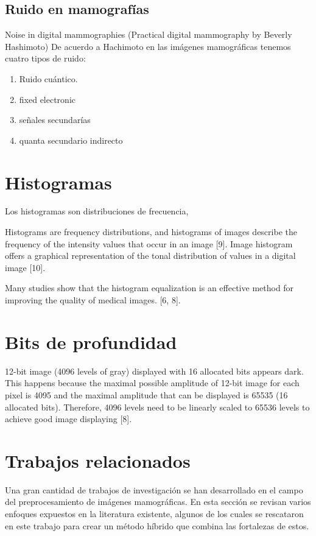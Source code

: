 \subsection{Ruido en mamografías}

Noise in digital mammographies (Practical digital mammography by Beverly
Hashimoto) De acuerdo a Hachimoto en las imágenes mamográficas tenemos cuatro
tipos de ruido:

\begin{enumerate}
    \item Ruido cuántico.
    \item fixed electronic
    \item señales secundarías
    \item quanta secundario indirecto
\end{enumerate}

\section{Histogramas}
Los histogramas son distribuciones de frecuencia, 

Histograms are frequency distributions, and histograms of images describe the
frequency of the intensity values that occur in an image [9]. Image histogram
offers a graphical representation of the tonal distribution of values in a
digital image [10].


Many studies show that the histogram equalization is an effective method for
improving the quality of medical images. [6, 8]. 

\section{Bits de profundidad}

12-bit image (4096 levels of gray) displayed with 16 allocated bits appears
dark. This happens because the maximal possible amplitude of 12-bit image for
each pixel is 4095 and the maximal amplitude that can be displayed is 65535 (16
allocated bits). Therefore, 4096 levels need to be linearly scaled to 65536
levels to achieve good image displaying [8].

\section{Trabajos relacionados}

Una gran cantidad de trabajos de investigación se han desarrollado en el
campo del preprocesamiento de imágenes mamográficas. En esta sección se revisan
varios enfoques expuestos en la literatura existente, algunos de los cuales se
rescataron en este trabajo para crear un método híbrido que combina las
fortalezas de estos. 

